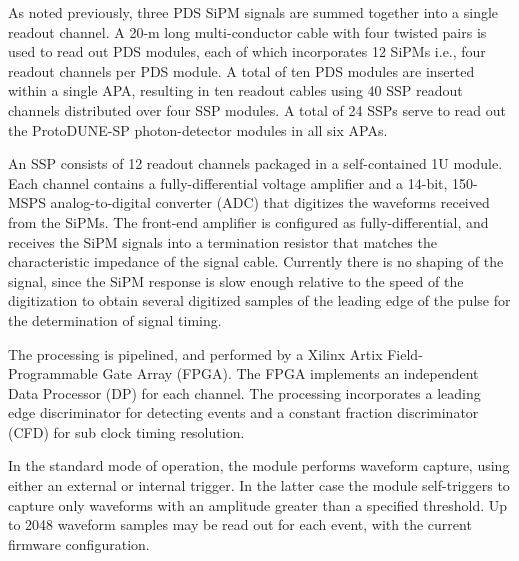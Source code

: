 As noted previously, three PDS SiPM signals are summed together into a single readout channel. 
A 20-m long multi-conductor cable with four twisted pairs is used to read out PDS modules,
each of which incorporates  12 SiPMs i.e., four readout channels per PDS module.
A total of ten PDS modules are inserted within a single APA, resulting in ten readout cables
using 40 SSP readout channels distributed over four SSP modules. A total of 24 SSPs serve
to read out the ProtoDUNE-SP photon-detector modules in all six APAs.

%
An SSP consists of 12 readout channels packaged in a self-contained 1U module.  
Each channel contains a fully-differential voltage amplifier and a 14-bit, 150-MSPS analog-to-digital converter (ADC) that 
digitizes the waveforms received from the SiPMs.  
The front-end amplifier is configured as fully-differential, and receives the SiPM signals into a termination resistor that 
matches the characteristic impedance of the signal cable. 
Currently there is no shaping of the signal, since the SiPM response 
is slow enough relative to the speed of the digitization to obtain 
several digitized samples of the leading edge of the pulse for the determination of signal timing.  

The processing is pipelined, and performed by a Xilinx Artix Field-Programmable Gate Array (FPGA).  
The FPGA implements an independent Data Processor (DP) for each channel.  
The processing incorporates a leading edge discriminator for detecting events
and a constant fraction discriminator (CFD) for sub 
clock timing resolution.  

In the standard mode of operation, the module performs waveform capture, 
using either an external or internal trigger.  
In the latter case the module self-triggers to capture only waveforms with an amplitude greater than
a specified threshold.
Up to 2048 waveform samples may be read out for each event, with the current firmware 
configuration.

